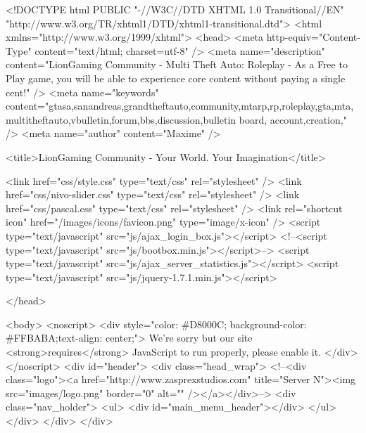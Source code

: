 <!DOCTYPE html PUBLIC "-//W3C//DTD XHTML 1.0 Transitional//EN" "http://www.w3.org/TR/xhtml1/DTD/xhtml1-transitional.dtd">
<html xmlns="http://www.w3.org/1999/xhtml">
    <head>
        <meta http-equiv="Content-Type" content="text/html; charset=utf-8" />
        <meta name="description" content="LionGaming Community - Multi Theft Auto: Roleplay - As a Free to Play game, you will be able to experience core content without paying a single cent!" />
        <meta name="keywords" content="gtasa,sanandreas,grandtheftauto,community,mtarp,rp,roleplay,gta,mta,multitheftauto,vbulletin,forum,bbs,discussion,bulletin board, account,creation," />
        <meta name="author" content="Maxime" />

        <title>LionGaming Community - Your World. Your Imagination</title>

        <link href="css/style.css" type="text/css" rel="stylesheet" />
        <link href="css/nivo-slider.css" type="text/css" rel="stylesheet" />
        <link href="css/pascal.css" type="text/css" rel="stylesheet" />
        <link rel="shortcut icon" href="/images/icons/favicon.png" type="image/x-icon" />
        <script type="text/javascript" src="js/ajax_login_box.js"></script>
        <!--<script type="text/javascript" src="js/bootbox.min.js"></script>-->
        <script type="text/javascript" src="js/ajax_server_statistics.js"></script>
	 <script type="text/javascript" src="js/jquery-1.7.1.min.js"></script>

    </head>

    <body>
        <noscript>
            <div style="color: #D8000C;
                 background-color: #FFBABA;text-align: center;">
                We're sorry but our site <strong>requires</strong> JavaScript to run properly, please enable it.
            </div>    
        </noscript>
        <div id="header">
            <div class="head_wrap">
                <!--<div class="logo"><a href="http://www.zasprexstudios.com" title="Server N"><img src="images/logo.png" border="0" alt="" /></a></div>-->
                <div class="nav_holder">
                    <ul>
                        <div id="main_menu_header"></div>
                    </ul>
                </div>
            </div>
        </div>
		
